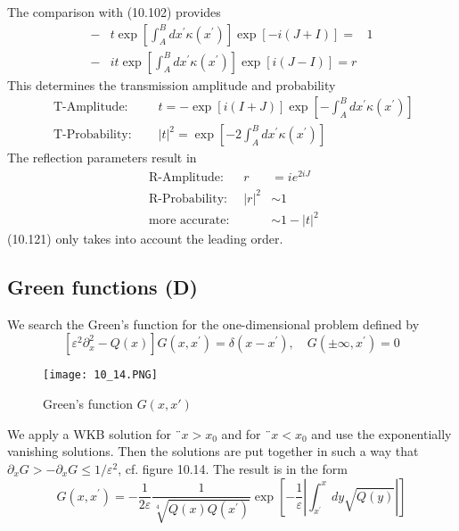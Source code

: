 The comparison with (10.102) provides
\begin{equation}
\begin{aligned}-& t \exp \left[\int_{A}^{B} d x^{\prime} \kappa\left(x^{\prime}\right)\right] \exp [-i(J+I)]=& 1 \\-& i t \exp \left[\int_{A}^{B} d x^{\prime} \kappa\left(x^{\prime}\right)\right] \exp [i(J-I)]=r \end{aligned}
\end{equation}
This determines the transmission amplitude and probability
\begin{equation}
\begin{array}{rl}
\text { T-Amplitude: } & \quad t=-\exp [i(I+J)] \exp \left[-\int_{A}^{B} d x^{\prime} \kappa\left(x^{\prime}\right)\right] \\ 
\text { T-Probability: } &\quad|t|^{2}=\exp \left[-2 \int_{A}^{B} d x^{\prime} \kappa\left(x^{\prime}\right)\right]
\end{array}
\end{equation}
The reflection parameters result in
\begin{eqnarray} 
    \text { R-Amplitude: } & r&=i e^{2 i J}\nonumber\\ 
    \text { R-Probability: } &|r|^{2} &\sim 1 \\ 
    \text { more accurate: } & &\sim 1-|t|^{2} 
\end{eqnarray}
(10.121) only takes into account the leading order.
\subsection{Green functions (D)}
We search the Green’s function for the one-dimensional problem defined by
\begin{equation}
    \left[\varepsilon^{2} \partial_{x}^{2}-Q(x)\right] G\left(x, x^{\prime}\right)=\delta\left(x-x^{\prime}\right), \quad G\left(\pm \infty, x^{\prime}\right)=0
    \end{equation}
\begin{figure}[ht]
    \begin{minipage}{0.6\textwidth}
        \centering
        \texttt{[image: 10\_14.PNG]}
    \end{minipage}
    \begin{minipage}{0.4\textwidth}
        \caption{Green's function $G(x,x')$}
    \end{minipage}
\end{figure}
We apply a WKB solution for $¨ x> x_0$ and for $¨ x <x_0$ and use the exponentially vanishing solutions. Then the solutions are put together in such a way that $\partial_xG> - \partial_xG \leq 1 / \varepsilon^2$, cf. figure 10.14. The result is in the form 
\begin{equation}
    G\left(x, x^{\prime}\right)=-\frac{1}{2 \varepsilon} \frac{1}{\sqrt[4]{Q(x) Q\left(x^{\prime}\right)}} \exp \left[-\frac{1}{\varepsilon}\left|\int_{x^{\prime}}^{x} d y \sqrt{Q(y)}\right|\right] 
    \end{equation}
